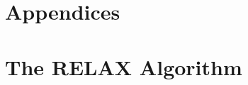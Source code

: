 \documentclass{article}
\begin{document}













\clearpage
\section*{Appendices}
\appendix




\section{The RELAX Algorithm}
\label{relax proof}
\end{document}
